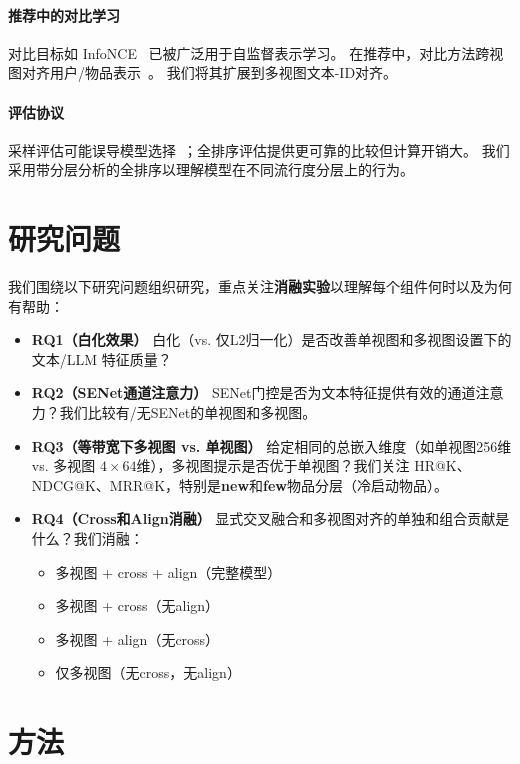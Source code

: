 \documentclass[sigconf,natbib=true]{acmart}
\newcommand{\llm}{\textsc{LLM}\xspace}
\newcommand{\InfoNCE}{InfoNCE\xspace}
\begin{document}
\paragraph{推荐中的对比学习}
对比目标如 \InfoNCE~\cite{oord2018cpc} 已被广泛用于自监督表示学习。
在推荐中，对比方法跨视图对齐用户/物品表示~\cite{wu2021cl4rec}。
我们将其扩展到多视图文本-ID对齐。

\paragraph{评估协议}
采样评估可能误导模型选择~\cite{krichene2020sampledmetrics}；全排序评估提供更可靠的比较但计算开销大。
我们采用带分层分析的全排序以理解模型在不同流行度分层上的行为。

\section{研究问题}
我们围绕以下研究问题组织研究，重点关注\textbf{消融实验}以理解每个组件何时以及为何有帮助：

\begin{itemize}[leftmargin=*,itemsep=3pt]
  \item \textbf{RQ1（白化效果）} 白化（vs. 仅L2归一化）是否改善单视图和多视图设置下的文本/\llm 特征质量？
  
  \item \textbf{RQ2（SENet通道注意力）} SENet门控是否为文本特征提供有效的通道注意力？我们比较有/无SENet的单视图和多视图。
  
  \item \textbf{RQ3（等带宽下多视图 vs. 单视图）} 给定相同的总嵌入维度（如单视图256维 vs. 多视图 $4\times 64$维），多视图提示是否优于单视图？我们关注 HR@K、NDCG@K、MRR@K，特别是\textbf{new}和\textbf{few}物品分层（冷启动物品）。
  
  \item \textbf{RQ4（Cross和Align消融）} 显式交叉融合和多视图对齐的单独和组合贡献是什么？我们消融：
  \begin{itemize}[leftmargin=*,itemsep=1pt]
    \item 多视图 + cross + align（完整模型）
    \item 多视图 + cross（无align）
    \item 多视图 + align（无cross）
    \item 仅多视图（无cross，无align）
  \end{itemize}
\end{itemize}

\section{方法}
\end{document}

